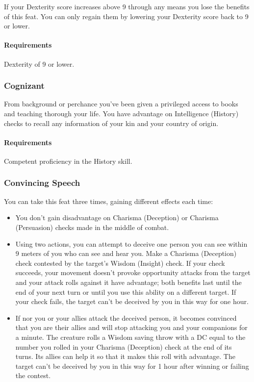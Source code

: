     If your Dexterity score increases above 9 through any means you lose the benefits of this feat.
    You can only regain them by lowering your Dexterity score back to 9 or lower.
    \paragraph{Requirements} Dexterity of 9 or lower.
\subsubsection{Cognizant} \label{feat::cognizant}
    From background or perchance you've been given a privileged access to books and teaching thorough your life.
    You have advantage on Intelligence (History) checks to recall any information of your kin and your country of origin.
    \paragraph{Requirements} Competent proficiency in the History skill.
\subsubsection{Convincing Speech} \label{feat::convincingspeech}
    You can take this feat three times, gaining different effects each time:
    \begin{itemize}
        \item You don't gain disadvantage on Charisma (Deception) or Charisma (Persuasion) checks made in the middle of combat.
        \item Using two actions, you can attempt to deceive one person you can see within 9 meters of you who can see and hear you.
        Make a Charisma (Deception) check contested by the target's Wisdom (Insight) check.
        If your check succeeds, your movement doesn't provoke opportunity attacks from the target and your attack rolls against it have advantage; both benefits last until the end of your next turn or until you use this ability on a different target.
        If your check fails, the target can't be deceived by you in this way for one hour.
        \item If nor you or your allies attack the deceived person, it becomes convinced that you are their allies and will stop attacking you and your companions for a minute.
        The creature rolls a Wisdom saving throw with a DC equal to the number you rolled in your Charisma (Deception) check at the end of its turns.
        Its allies can help it so that it makes this roll with advantage.
        The target can't be deceived by you in this way for 1 hour after winning or failing the contest.
    \end{itemize}
